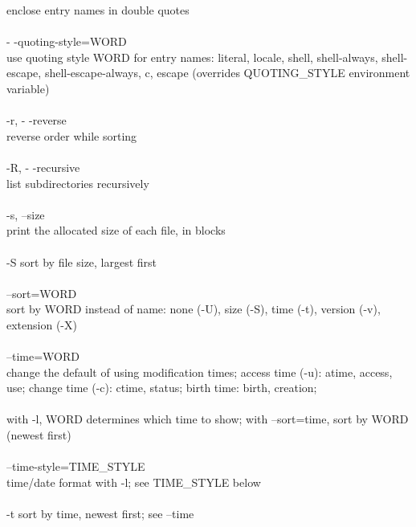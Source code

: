 \documentclass{article}
\begin{document}
\tabto{2cm}              enclose entry names in double quotes \\
\\
\tabto{1cm}       - -quoting-style=WORD \\
\tabto{2cm}              use  quoting style WORD for entry names: literal, locale, shell,
\tabto{2cm}              shell-always,  shell-escape,  shell-escape-always,   c,   escape
\tabto{2cm}              (overrides QUOTING_STYLE environment variable) \\
\\
\tabto{1cm}       -r, - -reverse \\
\tabto{2cm}              reverse order while sorting \\
\\
\tabto{1cm}       -R, - -recursive \\
\tabto{2cm}              list subdirectories recursively \\
\\
\tabto{1cm}       -s, --size \\
\tabto{2cm}              print the allocated size of each file, in blocks \\
\\
\tabto{1cm}       -S     sort by file size, largest first \\
\\
\tabto{1cm}       --sort=WORD \\
\tabto{2cm}              sort  by  WORD instead of name: none (-U), size (-S), time (-t),
\tabto{2cm}              version (-v), extension (-X) \\
\\
\tabto{1cm}       --time=WORD \\
\tabto{2cm}              change the default of  using  modification  times;  access  time
\tabto{2cm}              (-u): atime, access, use; change time (-c): ctime, status; birth
\tabto{2cm}              time: birth, creation; \\
\\
\tabto{2cm}             with -l, WORD determines which time to show;  with  --sort=time,
\tabto{2cm}              sort by WORD (newest first) \\
\\
\tabto{1cm}       --time-style=TIME_STYLE \\
\tabto{2cm}              time/date format with -l; see TIME_STYLE below \\
\\
\tabto{1cm}       -t     sort by time, newest first; see --time \\
\end{document}
